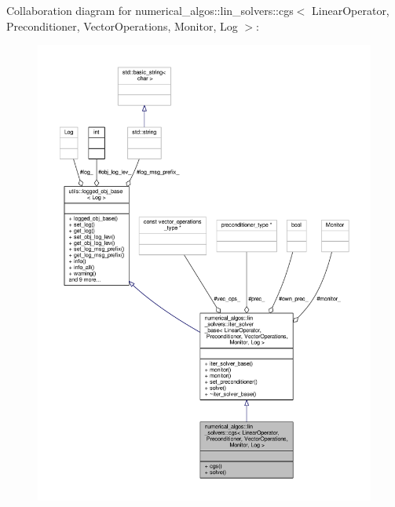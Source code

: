 Collaboration diagram for numerical\-\_\-algos\-:\-:lin\-\_\-solvers\-:\-:cgs$<$ Linear\-Operator, Preconditioner, Vector\-Operations, Monitor, Log $>$\-:
\nopagebreak
\begin{figure}[H]
\begin{center}
\leavevmode
\includegraphics[width=350pt]{classnumerical__algos_1_1lin__solvers_1_1cgs__coll__graph}
\end{center}
\end{figure}
